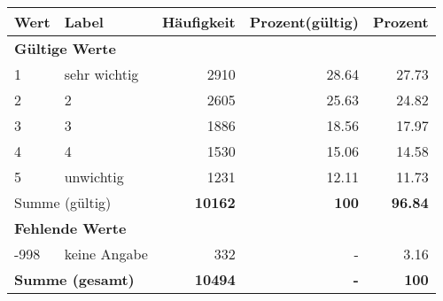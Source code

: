      \begin{longtable}{lXrrr}
     \toprule
     \textbf{Wert} & \textbf{Label} & \textbf{Häufigkeit} & \textbf{Prozent(gültig)} & \textbf{Prozent} \\
     \endhead
     \midrule
     \multicolumn{5}{l}{\textbf{Gültige Werte}}\\

     1 &
     \multicolumn{1}{X}{ sehr wichtig   } &


       \num{2910} &
       \num[round-mode=places,round-precision=2]{28.64} &
         \num[round-mode=places,round-precision=2]{27.73} \\

     2 &
     \multicolumn{1}{X}{ 2   } &


       \num{2605} &
       \num[round-mode=places,round-precision=2]{25.63} &
         \num[round-mode=places,round-precision=2]{24.82} \\

     3 &
     \multicolumn{1}{X}{ 3   } &


       \num{1886} &
       \num[round-mode=places,round-precision=2]{18.56} &
         \num[round-mode=places,round-precision=2]{17.97} \\

     4 &
     \multicolumn{1}{X}{ 4   } &


       \num{1530} &
       \num[round-mode=places,round-precision=2]{15.06} &
         \num[round-mode=places,round-precision=2]{14.58} \\

     5 &
     \multicolumn{1}{X}{ unwichtig   } &


       \num{1231} &
       \num[round-mode=places,round-precision=2]{12.11} &
         \num[round-mode=places,round-precision=2]{11.73} \\
     \midrule
     \multicolumn{2}{l}{Summe (gültig)} &
       \textbf{\num{10162}} &
     \textbf{\num{100}} &
       \textbf{\num[round-mode=places,round-precision=2]{96.84}} \\
     \multicolumn{5}{l}{\textbf{Fehlende Werte}}\\
       -998 &
       keine Angabe &
         \num{332} &
        - &
         \num[round-mode=places,round-precision=2]{3.16} \\
     \midrule
     \multicolumn{2}{l}{\textbf{Summe (gesamt)}} &
          \textbf{\num{10494}} &
        \textbf{-} &
        \textbf{\num{100}} \\
     \bottomrule
     \end{longtable}
     
